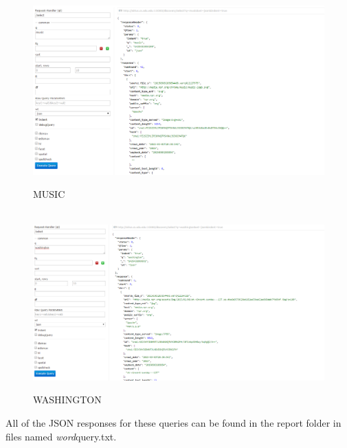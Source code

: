 \documentclass[12pt]{article}
\begin{document}
\begin{figure}[H]
    \caption{MUSIC}
    \centering
    \includegraphics[scale=0.5]{music.PNG}
\end{figure}

\begin{figure}[H]
    \caption{WASHINGTON}
    \centering
    \includegraphics[scale=0.5]{washingtonquery.PNG}
\end{figure}

All of the JSON responses for these queries can be found in the report folder in files named \textit{word}query.txt.
\end{document}
